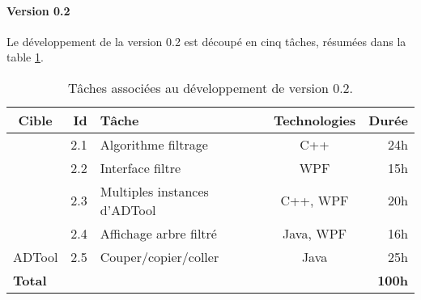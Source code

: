 \paragraph{Version 0.2} Le développement de la version 0.2 est découpé en cinq tâches, résumées dans la {\sc table} \ref{tab:taches_units_2}.
            \begin{table}[h]
                \centering
                \begin{tabular}{|c|r|l|c|r|}
                    \hline
                    \textbf{Cible} & \textbf{Id} & \textbf{Tâche} & \textbf{Technologies} & \textbf{Durée}\\
                    \hline

                    \multirow{4}{*}{\glasir{}} & 2.1 & Algorithme filtrage & C++ & 24h\\
                    \cline{2-5}
                     & 2.2 & Interface filtre & WPF & 15h\\
                    \cline{2-5}
                     & 2.3 & Multiples instances d'ADTool & C++, WPF & 20h\\
                    \cline{2-5}
                     & 2.4 & Affichage arbre filtré & Java, WPF & 16h\\
                    \hline

                    \multirow{1}{*}{ADTool} & 2.5 & Couper/copier/coller & \multirow{1}{*}{Java} & 25h\\
                    \hline

                    \multicolumn{4}{|l|}{\bf Total} & {\bf 100h}\\
                    \hline
                \end{tabular}
                \caption{Tâches associées au développement de \glasir{} version 0.2.}
                \label{tab:taches_units_2}
            \end{table}

